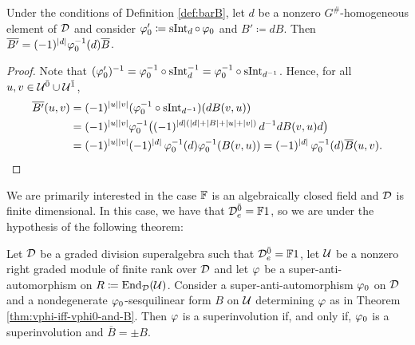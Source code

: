 \documentclass{amsbook}
\begin{document}
\begin{lemma}\label{lemma:bar-dB}
    Under the conditions of Definition \ref{def:barB}, let $d$ be a nonzero $G^\#$-homogeneous element of $\mathcal{D}$ and consider $\varphi_0' \coloneqq \operatorname{sInt}_d\circ\, \varphi_0$ and $B' \coloneqq d B$. 
    Then $\overline {B'} = (-1)^{|d|} \varphi_0^{-1} (d) \overline B$.
\end{lemma}

\begin{proof}
    Note that $(\varphi_0')^{-1} = \varphi_0^{-1} \circ \operatorname{sInt}_{d}^{-1} = \varphi_0^{-1} \circ \operatorname{sInt}_{d^{-1}}$. 
    Hence, for all $u, v \in \mathcal U^{\bar0} \cup \mathcal U^{\bar1}$,
    \begin{align*}
        \overline {B'} (u,v) &= (-1)^{|u||v|} (\varphi_0^{-1} \circ \operatorname{sInt}_{d^{-1}})  (d B(v, u) ) \\
        &= (-1)^{|u||v|} \varphi_0^{-1} \big( (-1)^{|d| (|d| + |B| + |u| + |v|)}\,  d^{-1} d B (v, u) d \big) \\ &= (-1)^{|u||v|} (-1)^{|d|}\, \varphi_0^{-1} (d) \varphi_0^{-1}(B(v, u)) =  (-1)^{|d|}\,\varphi_0^{-1} (d) \overline {B} (u, v).
    \end{align*}
\end{proof}

We are primarily interested in the case $\mathbb{F}$ is an algebraically closed field and $\mathcal{D}$ is finite dimensional. 
In this case, we have that $\mathcal{D}^{\bar0}_e = \mathbb{F} 1$, so we are under the hypothesis of the following theorem:

\begin{thm}\label{thm:vphi-involution-iff-delta-pm-1}
    Let $\mathcal{D}$ be a graded division superalgebra such that $\mathcal{D}^{\bar0}_e = \mathbb{F} 1$, let $\mathcal U$ be a nonzero right graded module of finite rank over $\mathcal{D}$ and let $\varphi$ be a super-anti-automorphism on $R \coloneqq \operatorname{End}_{\mathcal{D}} (\mathcal U)$. 
    Consider a super-anti-automorphism $\varphi_0$ on $\mathcal{D}$ and a nondegenerate $\varphi_0$-sesqui\-li\-near form $B$ on $\mathcal U$ determining $\varphi$ as in Theorem \ref{thm:vphi-iff-vphi0-and-B}.
    Then $\varphi$ is a superinvolution if, and only if, $\varphi_0$ is a superinvolution and $\overline B = \pm B$. 
\end{thm}
\end{document}
